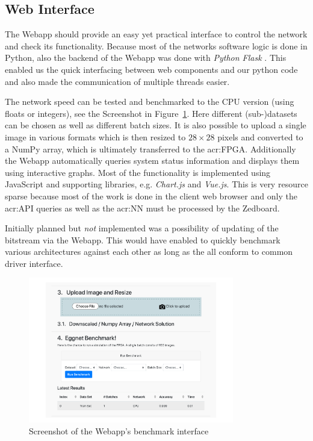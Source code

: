 \subsection{Web Interface}

The Webapp should provide an easy yet practical interface to control the network and check its functionality. Because most of the networks software logic is done in Python, also the backend of the Webapp was done with \emph{Python Flask} \cite{Pallets:2020aa}. This enabled us the quick interfacing between web components and our python code and also made the communication of multiple threads easier.

The network speed can be tested and benchmarked to the CPU version (using floats or integers), see the Screenshot in Figure~\ref{fig:sw-webapp-bench}. Here different (sub-)datasets can be chosen as well as different batch sizes. It is also possible to upload a single image in various formats which is then resized to $28 \times 28$ pixels and converted to a NumPy array, which is ultimately transferred to the \gls{acr:FPGA}. Additionally the Webapp automatically queries system status information and displays them using interactive graphs. Most of the functionality is implemented using JavaScript and supporting libraries, e.g. \emph{Chart.js} and \emph{Vue.js}. This is very resource sparse because most of the work is done in the client web browser and only the \gls{acr:API} queries as well as the \gls{acr:NN} must be processed by the Zedboard.

Initially planned but \emph{not} implemented was a possibility of updating of the bitstream via the Webapp. This would have enabled to quickly benchmark various architectures against each other as long as the all conform to common driver interface.

\begin{figure}[hbtp]
  \centering
  \includegraphics[width=0.8\textwidth]{img/webapp_bench}
  \caption{Screenshot of the Webapp's benchmark interface}
  \label{fig:sw-webapp-bench}
\end{figure}


